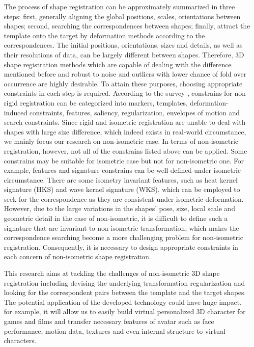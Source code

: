 The process of shape registration can be approximately summarized in three steps: first, generally aligning the global positions, scales, orientations between shapes; second, searching the correspondences between shapes; finally, attract the template onto the target by deformation methods according to the correspondences. The initial positions, orientations, sizes and details, as well as their resolutions of data, can be largely different between shapes. Therefore, 3D shape registration methods which are capable of dealing with the difference mentioned before and robust to noise and outliers with lower chance of fold over occurrence are highly desirable. To attain these purposes, choosing appropriate constraints in each step is required. According to the survey \citep{tam2013registration}, constrains for non-rigid registration can be categorized into markers, templates, deformation-induced constraints, features, saliency, regularization, envelopes of motion and search constraints. Since rigid and isometric registration are unable to deal with shapes with large size difference, which indeed exists in real-world circumstance, we mainly focus our research on non-isometric case. In terms of non-isometric registration, however, not all of the constrains listed above can be applied. Some constrains may be suitable for isometric case but not for non-isometric one. For example, features and signature constrains can be well defined under isometric circumstance. There are some isometry invariant features, such as heat kernel signature (HKS)\citep{sun2009concise} and wave kernel signature (WKS)\citep{aubry2011wave}, which can be employed to seek for the correspondence as they are consistent under isometric deformation. However, due to the large variations in the shapes' pose, size, local scale and geometric detail in the case of non-isometric, it is difficult to define such a signature that are invariant to non-isometric transformation, which makes the correspondence searching become a more challenging problem for non-isometric registration. Consequently, it is necessary to design appropriate constraints in each concern of non-isometric shape registration.

This research aims at tackling the challenges of non-isometric 3D shape registration including devising the underlying transformation regularization and looking for the correspondent pairs between the template and the target shapes. The potential application of the developed technology could have huge impact, for example, it will allow us to easily build virtual personalized 3D character for games and films and transfer necessary features of avatar such as face performance, motion data, textures and even internal structure to virtual characters.


